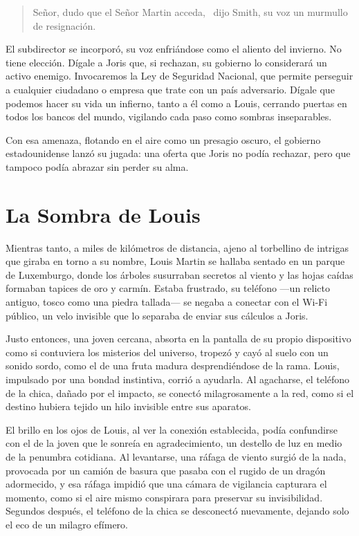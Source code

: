 \begin{quote}
\calligra
\glqq Señor, dudo que el Señor Martin acceda,\grqq~ dijo Smith, su voz un murmullo de resignación.
\end{quote}

El subdirector se incorporó, su voz enfriándose como el aliento del invierno. \glqq No tiene elección. Dígale a Joris que, si rechazan, su gobierno lo considerará un activo enemigo. Invocaremos la Ley de Seguridad Nacional, que permite perseguir a cualquier ciudadano o empresa que trate con un país adversario. Dígale que podemos hacer su vida un infierno, tanto a él como a Louis, cerrando puertas en todos los bancos del mundo, vigilando cada paso como sombras inseparables.\grqq

Con esa amenaza, flotando en el aire como un presagio oscuro, el gobierno estadounidense lanzó su jugada: una oferta que Joris no podía rechazar, pero que tampoco podía abrazar sin perder su alma.

\section{La Sombra de Louis}

Mientras tanto, a miles de kilómetros de distancia, ajeno al torbellino de intrigas que giraba en torno a su nombre, Louis Martin se hallaba sentado en un parque de Luxemburgo, donde los árboles susurraban secretos al viento y las hojas caídas formaban tapices de oro y carmín. Estaba frustrado, su teléfono ---un relicto antiguo, tosco como una piedra tallada--- se negaba a conectar con el Wi-Fi público, un velo invisible que lo separaba de enviar sus cálculos a Joris.

Justo entonces, una joven cercana, absorta en la pantalla de su propio dispositivo como si contuviera los misterios del universo, tropezó y cayó al suelo con un sonido sordo, como el de una fruta madura desprendiéndose de la rama. Louis, impulsado por una bondad instintiva, corrió a ayudarla. Al agacharse, el teléfono de la chica, dañado por el impacto, se conectó milagrosamente a la red, como si el destino hubiera tejido un hilo invisible entre sus aparatos.

El brillo en los ojos de Louis, al ver la conexión establecida, podía confundirse con el de la joven que le sonreía en agradecimiento, un destello de luz en medio de la penumbra cotidiana. Al levantarse, una ráfaga de viento surgió de la nada, provocada por un camión de basura que pasaba con el rugido de un dragón adormecido, y esa ráfaga impidió que una cámara de vigilancia capturara el momento, como si el aire mismo conspirara para preservar su invisibilidad. Segundos después, el teléfono de la chica se desconectó nuevamente, dejando solo el eco de un milagro efímero.

